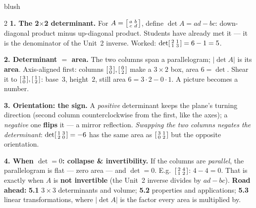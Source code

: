 \documentclass[10pt]{article}
\begin{document}
\begin{skillbox}[Lesson]{blush}
\begin{multicols}{2}
\textbf{1. The 2$\times$2 determinant.} For $A=\begin{bsmallmatrix} a & b\\ c & d \end{bsmallmatrix}$,
define $\det A=ad-bc$: down-diagonal product minus up-diagonal product. Students have already met
it --- it is the denominator of the Unit~2 inverse. Worked:
$\det\begin{bsmallmatrix} 2 & 1\\ 1 & 3 \end{bsmallmatrix}=6-1=5$.

\textbf{2. Determinant $=$ area.} The two columns span a parallelogram; $|\det A|$ is its
\textbf{area}. Axis-aligned first: columns $\begin{bsmallmatrix} 3\\0 \end{bsmallmatrix},
\begin{bsmallmatrix} 0\\2 \end{bsmallmatrix}$ make a $3\times2$ box, area $6=\det$. Shear it to
$\begin{bsmallmatrix} 3\\0 \end{bsmallmatrix},\begin{bsmallmatrix} 1\\2 \end{bsmallmatrix}$: base~$3$,
height~$2$, still area $6=3\cdot2-0\cdot1$. A picture becomes a number.

\columnbreak

\textbf{3. Orientation: the sign.} A \emph{positive} determinant keeps the plane's turning direction
(second column counterclockwise from the first, like the axes); a \emph{negative} one \textbf{flips}
it --- a mirror reflection. \emph{Swapping the two columns negates the determinant}:
$\det\begin{bsmallmatrix} 1 & 3\\ 2 & 0 \end{bsmallmatrix}=-6$ has the same area as
$\begin{bsmallmatrix} 3 & 1\\ 0 & 2 \end{bsmallmatrix}$ but the opposite orientation.

\textbf{4. When $\det=0$: collapse \& invertibility.} If the columns are \emph{parallel}, the
parallelogram is flat --- zero area --- and $\det=0$. E.g.\ $\begin{bsmallmatrix} 2 & 4\\ 1 & 2
\end{bsmallmatrix}$: $4-4=0$. That is exactly when $A$ is \textbf{not invertible} (the Unit~2
inverse divides by $ad-bc$). \textbf{Road ahead:} \textbf{5.1} $3\times3$ determinants and volume;
\textbf{5.2} properties and applications; \textbf{5.3} linear transformations, where $|\det A|$ is
the factor every area is multiplied by.
\end{multicols}
\end{skillbox}
\end{document}
